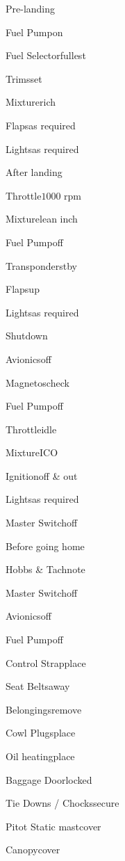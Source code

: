 \begin{multicols}{2}
\begin{checklist}{Pre-landing}
    \item{Fuel Pump}{on}
    \item{Fuel Selector}{fullest}
    \item{Trims}{set}
    \item{Mixture}{rich}
    \item{Flaps}{as required}
    \item{Lights}{as required}
\end{checklist}

\begin{checklist}{After landing}
    \item{Throttle}{$1000$ rpm}
    \item{Mixture}{lean  inch}
    \item{Fuel Pump}{off}
    \item{Transponder}{stby}
    \item{Flaps}{up}
    \item{Lights}{as required}
\end{checklist}

\begin{checklist}{Shutdown}
    \item{Avionics}{off}
    \item{Magnetos}{check}
    \item{Fuel Pump}{off}
    \item{Throttle}{idle}
    \item{Mixture}{ICO}
    \item{Ignition}{off \& out}
    \item{Lights}{as required}
    \item{Master Switch}{off}
\end{checklist}

\begin{checklist}{Before going home}
    \item{Hobbs \& Tach}{note}
    \item{Master Switch}{off}
    \item{Avionics}{off}
    \item{Fuel Pump}{off}
    \item{Control Strap}{place}
    \item{Seat Belts}{away}
    \item{Belongings}{remove}
    \item{Cowl Plugs}{place}
    \item{Oil heating}{place}
    \item{Baggage Door}{locked}
    \item{Tie Downs / Chocks}{secure}
    \item{Pitot Static mast}{cover}
    \item{Canopy}{cover}
\end{checklist}

\end{multicols}
